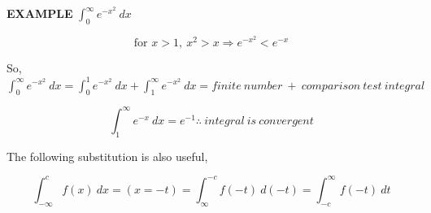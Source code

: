 \documentclass{article}
\begin{document}
\vspace{10pt}

{\bf{}EXAMPLE} $\displaystyle\int_0^\infty e^{-x^2}\ dx$

\[\mbox{for }x>1,\ x^2>x\Rightarrow e^{-x^2}<e^{-x}\]

\begin{center}
\end{center}

\vspace{10pt}

So, $\int_0^\infty e^{-x^2}\ dx=\int_0^1 e^{-x^2}\ dx+\int_1^\infty e^{-x^2}\ dx=finite\ number\ +\ comparison\ test\ integral$

\[\int_1^\infty e^{-x}\ dx=e^{-1}\therefore\ integral\ is\ convergent\]

The following substitution is also useful,

\[\int_{-\infty}^cf(x)\ dx=(x=-t)=\int_{\infty}^{-c}f(-t)\ d(-t)=\int_{-c}^\infty f(-t)\ dt\]
\end{document}

